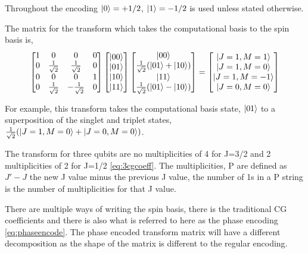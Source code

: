 \documentclass[12pt]{article}
\begin{document}
Throughout the encoding $\left\vert{0}\right\rangle=+1/2$, $\left\vert{1}\right\rangle=-1/2$ is used unless stated otherwise.

The matrix for the transform which takes the computational basis to the spin basis is,
\begin{align}
\begin{bmatrix}
1 & 0 & 0 & 0 \\
0 & \frac{1}{\sqrt{2}} & \frac{1}{\sqrt{2}} & 0 \\
0 & 0 & 0 & 1 \\
0 & \frac{1}{\sqrt{2}} & -\frac{1}{\sqrt{2}} & 0 \\
\end{bmatrix}
\begin{bmatrix}
\left\vert{00}\right\rangle \\
\left\vert{01}\right\rangle \\
\left\vert{10}\right\rangle \\
\left\vert{11}\right\rangle \\ 
\end{bmatrix}
\begin{bmatrix}
\left\vert{00}\right\rangle \\
\frac{1}{\sqrt{2}}(\left\vert{01}\right\rangle + \left\vert{10}\right\rangle) \\
\left\vert{11}\right\rangle \\
\frac{1}{\sqrt{2}}(\left\vert{01}\right\rangle - \left\vert{10}\right\rangle) \\ 
\end{bmatrix}
=
\begin{bmatrix}
\left\vert{J=1, M=1}\right\rangle \\
\left\vert{J=1, M=0}\right\rangle \\
\left\vert{J=1, M=-1}\right\rangle \\
\left\vert{J=0, M=0}\right\rangle \\ 
\end{bmatrix}
\end{align}

For example, this transform takes the computational basis state, $\left\vert{01}\right\rangle$ to a superposition of the singlet and triplet states, $\frac{1}{\sqrt{2}} (\left\vert{J=1, M=0}\right\rangle + \left\vert{J=0, M=0}\right\rangle)$. 

The transform for three qubits are no multiplicities of 4 for J=3/2 and 2 multiplicities of 2 for J=1/2  \autoref{eq:3cgcoeff}. The multiplicities, P are defined as $J'-J$ the new J value minus the previous J value, the number of 1s in a P string is the number of multiplicities for that J value.

There are multiple ways of writing the spin basis, there is the traditional CG coefficients and there is also what is referred to here as the phase encoding \autoref{eq:phaseencode}. The phase encoded transform matrix will have a different decomposition as the shape of the matrix is different to the regular encoding. 
\end{document}
